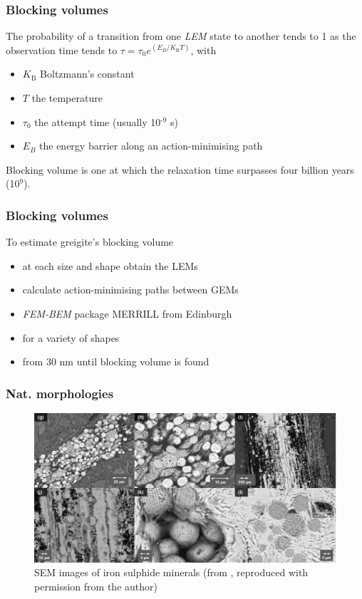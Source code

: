 \documentclass{beamer}
\begin{document}
        \begin{frame}
          \frametitle{Blocking volumes}
          The probability of a transition from one \textit{LEM} state to another tends to 1 as the observation time tends to $\tau=\tau_{\text{0}}\textit{e}^{\left(\textit{E}_{\textit{B}}/\textit{K}_{\text{B}}\textit{T}\right)}$, with
          \begin{itemize}
            \item $\textit{K}_{\text{B}}$ \alert{Boltzmann's constant}
            \item $\textit{T}$ \alert{the temperature}
            \item $\tau_{\text{0}}$ \alert{the attempt time} (usually 10$^{\text{-9}}$ s)
            \item $\textit{E}_{\textit{B}}$ \alert{the energy barrier} along an action-minimising path
          \end{itemize}
          Blocking volume is one at which the relaxation time surpasses \alert{four billion years} (10$^{\text{9}}$).
        \end{frame}

        \begin{frame}
          \frametitle{Blocking volumes}
          To estimate greigite's blocking volume
          \begin{itemize}
            \item at each size and shape \alert{obtain the LEMs}
            \item \color{ImperialNavy}calculate \alert{action-minimising paths} between GEMs
            \item \textit{FEM-BEM} package \alert{MERRILL} from Edinburgh
            \item for a variety of \alert{shapes}
            \item \alert{from 30 nm} until blocking volume is found

          \end{itemize}
        \end{frame}

		\begin{frame}
                  \frametitle{Nat. morphologies}
                  \begin{figure}[htb]
                    \centering
                    \includegraphics[width=\textwidth]{greigite_framboids.pdf}
                    \caption{SEM images of iron sulphide minerals (from \textcite{Roberts2015}, reproduced with permission from the author)}
                  \end{figure}
		\end{frame}
\end{document}
